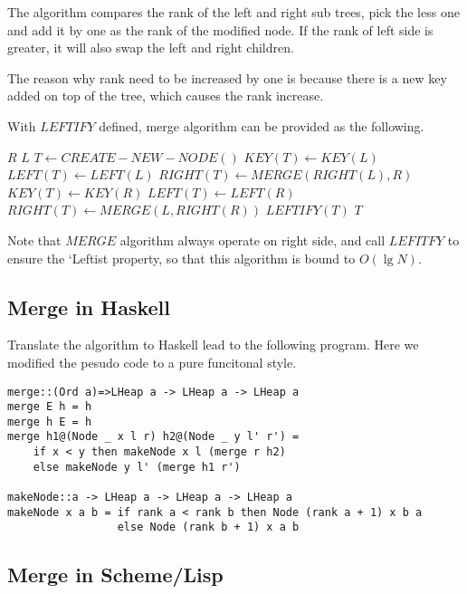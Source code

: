 \documentclass{article}
\begin{document}
The algorithm compares the rank of the left and
right sub trees, pick the less one and add it by one as the 
rank of the modified node. If the rank of left side is greater,
it will also swap the left and right children.

The reason why rank need to be increased by one is because there
is a new key added on top of the tree, which causes the rank 
increase.

With $LEFTIFY$ defined, merge algorithm can be provided as the
following.

\begin{algorithmic}[1]
    \State \Return $R$
    \State \Return $L$
  \Else
    \State $T \gets CREATE-NEW-NODE()$
      \State $KEY(T) \gets KEY(L)$
      \State $LEFT(T) \gets LEFT(L)$
      \State $RIGHT(T) \gets MERGE(RIGHT(L), R)$
    \Else
      \State $KEY(T) \gets KEY(R)$
      \State $LEFT(T) \gets LEFT(R)$
      \State $RIGHT(T) \gets MERGE(L, RIGHT(R))$
    \EndIf
    \State $LEFTIFY(T)$
  \EndIf
  \State \Return $T$
\EndFunction
\end{algorithmic}

Note that $MERGE$ algorithm always operate on right side, and call
$LEFITFY$ to ensure the `Leftist property, so that this algorithm
is bound to $O(\lg N)$.

\subsection*{Merge in Haskell}

Translate the algorithm to Haskell lead to the following program.
Here we modified the pesudo code to a pure funcitonal style.

\lstset{language=Haskell}
\begin{lstlisting}
merge::(Ord a)=>LHeap a -> LHeap a -> LHeap a
merge E h = h
merge h E = h
merge h1@(Node _ x l r) h2@(Node _ y l' r') = 
    if x < y then makeNode x l (merge r h2)
    else makeNode y l' (merge h1 r')

makeNode::a -> LHeap a -> LHeap a -> LHeap a
makeNode x a b = if rank a < rank b then Node (rank a + 1) x b a
                 else Node (rank b + 1) x a b
\end{lstlisting}

\subsection*{Merge in Scheme/Lisp}
\end{document}
